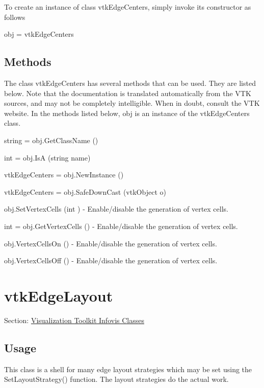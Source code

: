 To create an instance of class vtk\-Edge\-Centers, simply invoke its constructor as follows \begin{DoxyVerb}  obj = vtkEdgeCenters
\end{DoxyVerb}
 \hypertarget{vtkwidgets_vtkxyplotwidget_Methods}{}\subsection{Methods}\label{vtkwidgets_vtkxyplotwidget_Methods}
The class vtk\-Edge\-Centers has several methods that can be used. They are listed below. Note that the documentation is translated automatically from the V\-T\-K sources, and may not be completely intelligible. When in doubt, consult the V\-T\-K website. In the methods listed below, {\ttfamily obj} is an instance of the vtk\-Edge\-Centers class. 
\begin{DoxyItemize}
\item {\ttfamily string = obj.\-Get\-Class\-Name ()}  
\item {\ttfamily int = obj.\-Is\-A (string name)}  
\item {\ttfamily vtk\-Edge\-Centers = obj.\-New\-Instance ()}  
\item {\ttfamily vtk\-Edge\-Centers = obj.\-Safe\-Down\-Cast (vtk\-Object o)}  
\item {\ttfamily obj.\-Set\-Vertex\-Cells (int )} -\/ Enable/disable the generation of vertex cells.  
\item {\ttfamily int = obj.\-Get\-Vertex\-Cells ()} -\/ Enable/disable the generation of vertex cells.  
\item {\ttfamily obj.\-Vertex\-Cells\-On ()} -\/ Enable/disable the generation of vertex cells.  
\item {\ttfamily obj.\-Vertex\-Cells\-Off ()} -\/ Enable/disable the generation of vertex cells.  
\end{DoxyItemize}\hypertarget{vtkinfovis_vtkedgelayout}{}\section{vtk\-Edge\-Layout}\label{vtkinfovis_vtkedgelayout}
Section\-: \hyperlink{sec_vtkinfovis}{Visualization Toolkit Infovis Classes} \hypertarget{vtkwidgets_vtkxyplotwidget_Usage}{}\subsection{Usage}\label{vtkwidgets_vtkxyplotwidget_Usage}
This class is a shell for many edge layout strategies which may be set using the Set\-Layout\-Strategy() function. The layout strategies do the actual work.

